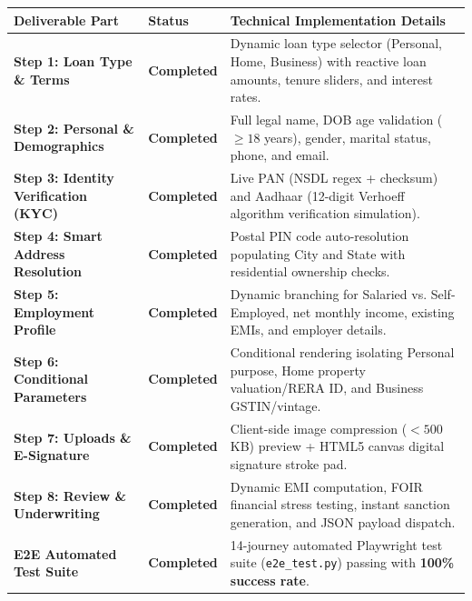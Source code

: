 \documentclass[11pt,a4paper]{article}
\begin{document}
\begin{table}[h]
\centering
\scriptsize
\begin{tabular}{@{}llp{8.5cm}@{}}
\toprule
\textbf{Deliverable Part} & \textbf{Status} & \textbf{Technical Implementation Details} \\ \midrule
\textbf{Step 1: Loan Type \& Terms} & \textbf{Completed} & Dynamic loan type selector (Personal, Home, Business) with reactive loan amounts, tenure sliders, and interest rates. \\
\textbf{Step 2: Personal \& Demographics} & \textbf{Completed} & Full legal name, DOB age validation ($\ge 18$ years), gender, marital status, phone, and email. \\
\textbf{Step 3: Identity Verification (KYC)} & \textbf{Completed} & Live PAN (NSDL regex + checksum) and Aadhaar (12-digit Verhoeff algorithm verification simulation). \\
\textbf{Step 4: Smart Address Resolution} & \textbf{Completed} & Postal PIN code auto-resolution populating City and State with residential ownership checks. \\
\textbf{Step 5: Employment Profile} & \textbf{Completed} & Dynamic branching for Salaried vs. Self-Employed, net monthly income, existing EMIs, and employer details. \\
\textbf{Step 6: Conditional Parameters} & \textbf{Completed} & Conditional rendering isolating Personal purpose, Home property valuation/RERA ID, and Business GSTIN/vintage. \\
\textbf{Step 7: Uploads \& E-Signature} & \textbf{Completed} & Client-side image compression ($<500$KB) preview + HTML5 canvas digital signature stroke pad. \\
\textbf{Step 8: Review \& Underwriting} & \textbf{Completed} & Dynamic EMI computation, FOIR financial stress testing, instant sanction generation, and JSON payload dispatch. \\
\textbf{E2E Automated Test Suite} & \textbf{Completed} & 14-journey automated Playwright test suite (\texttt{e2e\_test.py}) passing with \textbf{100\% success rate}. \\ \bottomrule
\end{tabular}
\end{table}
\end{document}
